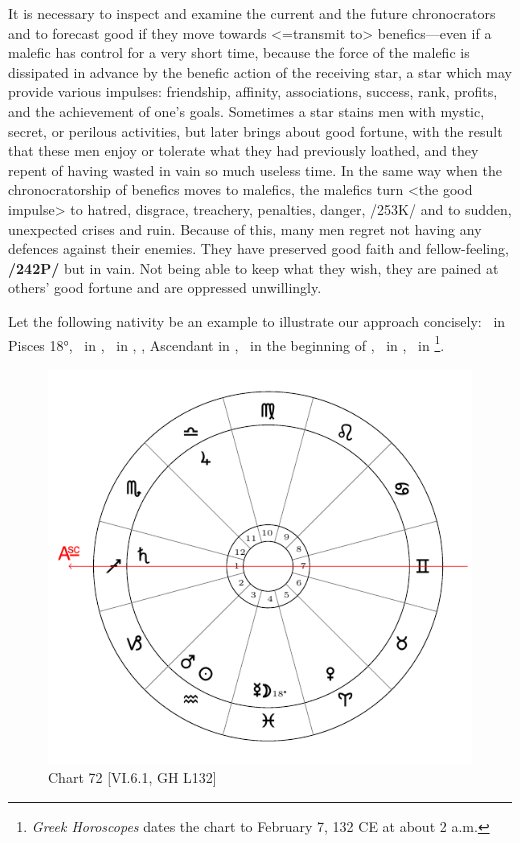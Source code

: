 It is necessary to inspect and examine the current and the future chronocrators and to forecast good if they move towards <=transmit to>  benefics—even if a malefic has control for a very short time, because the force of the malefic is dissipated in advance by the benefic action of the receiving star, a star which may provide various impulses: friendship, affinity, associations, success, rank, profits, and the achievement of one’s goals. Sometimes a star stains men with mystic, secret, or perilous activities, but later brings about good fortune, with the result that these men enjoy or tolerate what they had previously loathed, and they repent of having wasted in vain so much useless time. In the same way when the chronocratorship of benefics moves to  malefics, the malefics turn <the good impulse> to hatred, disgrace, treachery, penalties, danger, /253K/ and to sudden, unexpected crises and ruin. Because of this, many men regret not having any defences against their enemies. They have preserved good faith and fellow-feeling, \textbf{/242P/} but in vain. Not being able to keep what they wish, they are pained at others’ good fortune and are oppressed unwillingly.

\newpage
Let the following nativity be an example to illustrate our approach concisely: \Moon\, in Pisces 18°, \Venus\, in \Aries, \Jupiter\, in \Libra, \Saturn, Ascendant in \Sagittarius, \Mars\, in the beginning of \Aquarius, \Sun\, in \Aquarius, \Mercury\, in \Pisces\footnote{\textit{Greek Horoscopes} dates the chart to February 7, 132 CE at about 2 a.m.}. 

\begin{figure}
\centering
\vspace{-20pt}
\includegraphics[width=.68\textwidth]{charts/6_6_1}
\caption{Chart 72 [VI.6.1, GH L132]}
\label{fig:chart72}
\end{figure}

